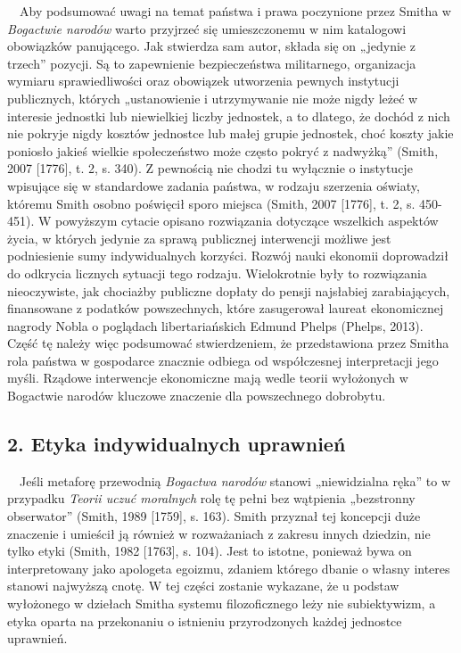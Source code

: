 \documentclass[a4paper]{article}
\begin{document}
\ \ Aby podsumować uwagi na temat państwa i prawa poczynione przez Smitha w \textit{Bogactwie narodów }warto przyjrzeć
się umieszczonemu w nim katalogowi obowiązków panującego. Jak stwierdza sam autor, składa się on „jedynie z trzech”
pozycji. Są to zapewnienie bezpieczeństwa militarnego, organizacja wymiaru sprawiedliwości oraz obowiązek utworzenia
pewnych instytucji publicznych, których „ustanowienie i utrzymywanie nie może nigdy leżeć w interesie jednostki lub
niewielkiej liczby jednostek, a to dlatego, że dochód z nich nie pokryje nigdy kosztów jednostce lub małej grupie
jednostek, choć koszty jakie poniosło jakieś wielkie społeczeństwo może często pokryć z nadwyżką”
\label{ref:RNDtabhicNFdT}(Smith, 2007 [1776], t. 2, s. 340). Z pewnością nie chodzi tu wyłącznie o instytucje wpisujące
się w standardowe zadania państwa, w rodzaju szerzenia oświaty, któremu Smith osobno poświęcił sporo miejsca
\label{ref:RND91wqVhsg2n}(Smith, 2007 [1776], t. 2, s. 450-451). W powyższym cytacie opisano rozwiązania dotyczące
wszelkich aspektów życia, w których jedynie za sprawą publicznej interwencji możliwe jest podniesienie sumy
indywidualnych korzyści. Rozwój nauki ekonomii doprowadził do odkrycia licznych sytuacji tego rodzaju. Wielokrotnie
były to rozwiązania nieoczywiste, jak chociażby publiczne dopłaty do pensji najsłabiej zarabiających, finansowane z
podatków powszechnych, które zasugerował laureat ekonomicznej nagrody Nobla o poglądach libertariańskich Edmund Phelps
\label{ref:RNDa9f9c5iU52}(Phelps, 2013). Część tę należy więc podsumować stwierdzeniem, że przedstawiona przez Smitha
rola państwa w gospodarce znacznie odbiega od współczesnej interpretacji jego myśli. Rządowe interwencje ekonomiczne
mają wedle teorii wyłożonych w Bogactwie narodów kluczowe znaczenie dla powszechnego dobrobytu. 

\subsection[2. Etyka indywidualnych uprawnień]{2. Etyka indywidualnych uprawnień}
\ \ Jeśli metaforę przewodnią \textit{Bogactwa narodów} stanowi „niewidzialna ręka” to w przypadku \textit{Teorii uczuć
moralnych} rolę tę pełni bez wątpienia „bezstronny obserwator” \label{ref:RNDkXOuGroqna}(Smith, 1989 [1759], s. 163).
Smith przyznał tej koncepcji duże znaczenie i umieścił ją również w rozważaniach z zakresu innych dziedzin, nie tylko
etyki \label{ref:RND3u7VBrgecb}(Smith, 1982 [1763], s. 104). Jest to istotne, ponieważ bywa on interpretowany jako
apologeta egoizmu, zdaniem którego dbanie o własny interes stanowi najwyższą cnotę. W tej części zostanie wykazane, że
u podstaw wyłożonego w dziełach Smitha systemu filozoficznego leży nie subiektywizm, a etyka oparta na przekonaniu o
istnieniu przyrodzonych każdej jednostce uprawnień.
\end{document}
